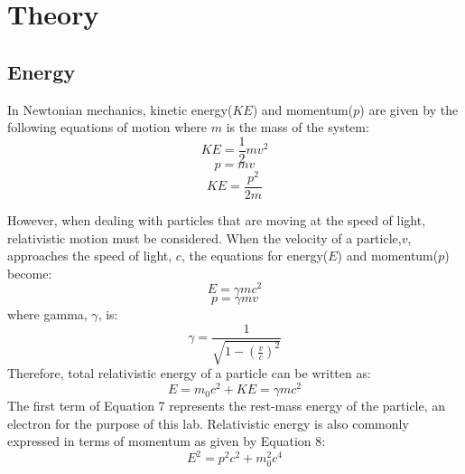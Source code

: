 \section{Theory}

\subsection{Energy}
In Newtonian mechanics, kinetic energy($KE$) and momentum($p$) are given by the following equations of motion where $m$ is the mass of the system:
\begin{equation}KE= \frac{1}{2}mv^2 \end{equation}
\begin{equation} p=mv \end{equation}
\begin {equation}KE=\frac{p^2}{2m} \end{equation}

However, when dealing with particles that are moving at the speed of light, relativistic motion must be considered. When the velocity of a particle,$v$, approaches the speed of light, $c$, the equations for energy($E$) and momentum($p$) become:
\begin{equation} E=\gamma mc^2\end{equation}
\begin{equation} p=\gamma mv\end{equation}
where gamma, $\gamma$, is:
\begin{equation} \gamma= \frac{1}{\sqrt{1-(\frac{v}{c})^2}}\end{equation}
Therefore, total relativistic energy of a particle can be written as:
\begin{equation} E=m_0c^2+KE=\gamma mc^2\end{equation}
The first term of Equation 7 represents the rest-mass energy of the particle, an electron for the purpose of this lab. Relativistic energy is also commonly expressed in terms of momentum as given by Equation 8:
\begin{equation}E^2=p^2c^2+m_0^2c^4\end{equation}
